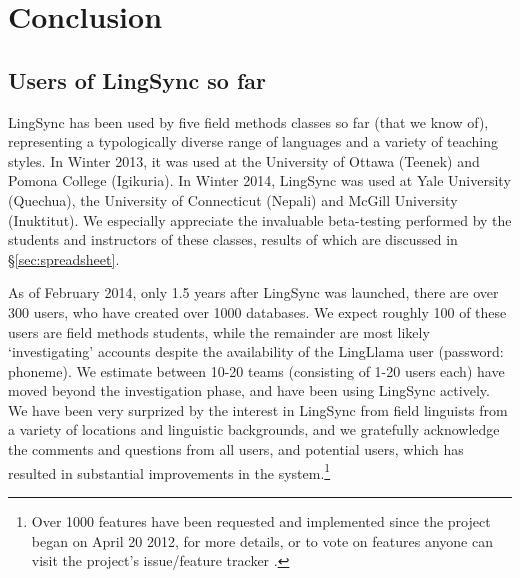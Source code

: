 \documentclass[letterpaper, 12pt, dvips]{mitwpl}
\begin{document}
%



\section{Conclusion } 
\label{sec:conclusion}

\subsection{Users of LingSync so far}
\label{sec:use}

LingSync has been used by five field methods classes so far (that we know of), representing a typologically diverse range of languages and a variety of teaching styles.  In Winter 2013, it was used 
at the University of Ottawa (Teenek) and Pomona College  (Igikuria). In Winter 2014, LingSync was  used at Yale University (Quechua),
 the University of Connecticut (Nepali)
and McGill University (Inuktitut). %
We especially appreciate the invaluable beta-testing  performed by the students and instructors of these classes, results of which are discussed in \S \ref{sec:spreadsheet}.

As of February 2014, only 1.5 years after LingSync was launched, there are over 300 users,
who have created over 1000 databases.
We expect roughly 100 of these users are field methods students, while the remainder are most likely `investigating' accounts despite the availability of the LingLlama user (password: phoneme).
We estimate between 10-20 teams (consisting of 1-20 users each) have moved beyond the investigation phase, and have been using LingSync actively. We have been very surprized by the interest in LingSync from field linguists from a variety of locations and linguistic backgrounds, and we gratefully acknowledge the comments and questions from all users, and potential users, which has resulted in substantial improvements in the system.\footnote{Over 1000 features have been requested and implemented since the project began on April 20 2012, for more details, or to vote on features anyone can visit the project's issue/feature tracker \citep{LingSync:2012:ISSUES}. }
\end{document}
